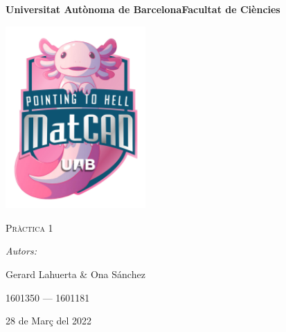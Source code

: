 \documentclass[12pt]{article}
\begin{document}
\begin{titlepage}
    \centering
    {\bfseries\LARGE Universitat Autònoma de Barcelona\newline Facultat de Ciències\par}
    \vspace{2cm}
    {\hspace{-1em}\includegraphics[width=0.4\textwidth]{logo.png}\par}
    \vspace{1cm}
    {\scshape\Huge Pràctica 1\par} %
    \vspace{1cm}
    {\Large \itshape Autors: \par}
    {\Large \hspace{-1.75em} Gerard Lahuerta \& Ona Sánchez \par}
    {\Large 1601350 --- 1601181 \par}
    \vspace{1cm}
    {\Large 28 de Març del 2022\par}
\end{titlepage}

\justifying

\newpage
\setcounter{page}{2}
\pagestyle{plain}
\tableofcontents
\cleardoublepage
{}
\newpage
\end{document}
